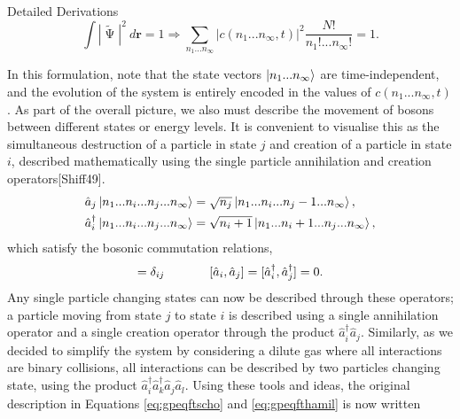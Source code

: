 \begin{chapter}{Detailed Derivations\label{app:App2}}
\begin{equation*}
\int|\tilde{\upPsi}|^2~d\mathbf{r}=1 \Rightarrow \sum_{n_1...n_\infty}|c(n_1...n_\infty,t)|^2\frac{N!}{n_1!...n_\infty!} = 1.
\end{equation*}

In this formulation, note that the state vectors $\ket{n_1...n_\infty}$ are time-independent, and the evolution of the system is entirely encoded in the values of $c(n_1...n_\infty,t)$. As part of the overall picture, we also must describe the movement of bosons between different states or energy levels. It is convenient to visualise this as the simultaneous destruction of a particle in state $j$ and creation of a particle in state $i$, described mathematically using the single particle annihilation and creation operators[Shiff49].
\begin{align*}
&\hat{a}_j\ket{n_1...n_i...n_j...n_\infty} = \sqrt{n_j}\ket{n_1...n_i...n_j-1...n_\infty},\\
&\hat{a}^\dagger_i\ket{n_1...n_i...n_j...n_\infty} = \sqrt{n_i+1}\ket{n_1...n_i+1...n_j...n_\infty},
\end{align*}
which satisfy the bosonic commutation relations,
\begin{equation*}
[\hat{a}_i,\hat{a}_j^\dagger]=\delta_{ij}\hspace{0.5in}[\hat{a}_i,\hat{a}_j]=[\hat{a}_i^\dagger,\hat{a}_j^\dagger]=0.
\end{equation*}
Any single particle changing states can now be described through these operators; a particle moving from state $j$ to state $i$ is described using a single annihilation operator and a single creation operator through the product $\hat{a}_i^\dagger\hat{a}_j$. Similarly, as we decided to simplify the system by considering a dilute gas where all interactions are binary collisions, all interactions can be described by two particles changing state, using the product $\hat{a}_i^\dagger\hat{a}_k^\dagger\hat{a}_j\hat{a}_l$. Using these tools and ideas, the original description in Equations \ref{eq:gpeqftscho} and \ref{eq:gpeqfthamil} is now written


\end{chapter}
